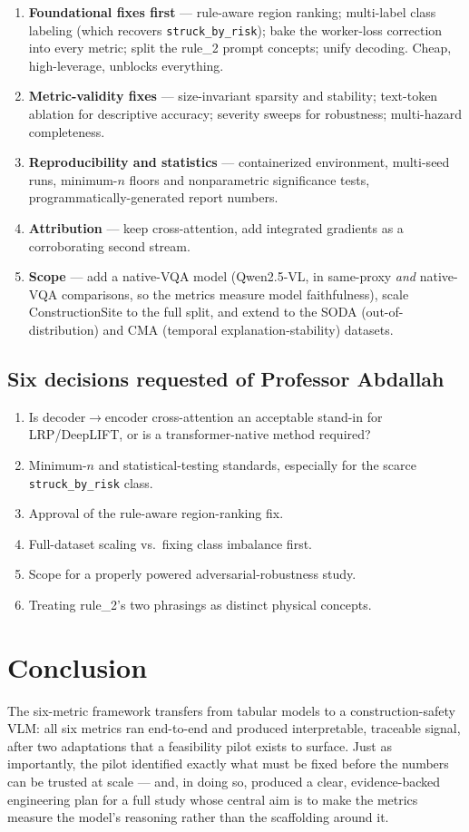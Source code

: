 \documentclass[11pt]{article}
\newcommand{\code}[1]{\texttt{\small #1}}
\begin{document}
\begin{enumerate}[leftmargin=*,itemsep=2pt]
\item \textbf{Foundational fixes first} --- rule-aware region ranking; multi-label class labeling (which
recovers \code{struck\_by\_risk}); bake the worker-loss correction into every metric; split the
rule\_2 prompt concepts; unify decoding. Cheap, high-leverage, unblocks everything.
\item \textbf{Metric-validity fixes} --- size-invariant sparsity and stability; text-token ablation for
descriptive accuracy; severity sweeps for robustness; multi-hazard completeness.
\item \textbf{Reproducibility and statistics} --- containerized environment, multi-seed runs,
minimum-$n$ floors and nonparametric significance tests, programmatically-generated report numbers.
\item \textbf{Attribution} --- keep cross-attention, add integrated gradients as a corroborating second
stream.
\item \textbf{Scope} --- add a native-VQA model (Qwen2.5-VL, in same-proxy \emph{and} native-VQA
comparisons, so the metrics measure model faithfulness), scale ConstructionSite to the full split, and
extend to the SODA (out-of-distribution) and CMA (temporal explanation-stability) datasets.
\end{enumerate}

\subsection*{Six decisions requested of Professor Abdallah}
\begin{enumerate}[leftmargin=*,itemsep=1pt]
\item Is decoder$\to$encoder cross-attention an acceptable stand-in for LRP/DeepLIFT, or is a
transformer-native method required?
\item Minimum-$n$ and statistical-testing standards, especially for the scarce \code{struck\_by\_risk}
class.
\item Approval of the rule-aware region-ranking fix.
\item Full-dataset scaling vs.\ fixing class imbalance first.
\item Scope for a properly powered adversarial-robustness study.
\item Treating rule\_2's two phrasings as distinct physical concepts.
\end{enumerate}

\section{Conclusion}

The six-metric framework transfers from tabular models to a construction-safety VLM: all six metrics ran
end-to-end and produced interpretable, traceable signal, after two adaptations that a feasibility pilot
exists to surface. Just as importantly, the pilot identified exactly what must be fixed before the
numbers can be trusted at scale --- and, in doing so, produced a clear, evidence-backed engineering plan
for a full study whose central aim is to make the metrics measure the model's reasoning rather than the
scaffolding around it.
\end{document}
